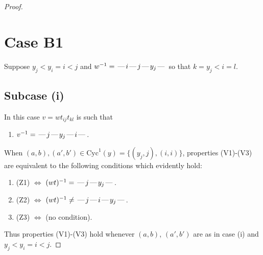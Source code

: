 \documentclass[10pt]{article}
\theoremstyle{definition}
\theoremstyle{definition}
\def\dash{\text{\hspace{0.5mm}---\hspace{0.5mm}}}
\def\Cyc{\mathrm{Cyc}}
\begin{document}
\begin{proof}
\section{Case B1}
Suppose $y_j < y_i = i < j$ and $w^{-1} = \dash i\dash j\dash y_j\dash $ so that $k=y_j < i=l$.
\subsection{Subcase (i)}
In this case $v = wt_{ij}t_{kl}$ is such that
\begin{enumerate}\item[]$v^{-1} = \dash j\dash y_j\dash i\dash $.\end{enumerate}
When $(a,b),(a',b')\in\Cyc^1(y)= \{(y_j,j),(i,i)\}$,
properties (V1)-(V3) are equivalent to the following conditions which evidently hold:
\begin{enumerate}
\item[](Z1) $\Leftrightarrow$ $(wt)^{-1} = \dash j \dash y_j \dash$.
\item[](Z2) $\Leftrightarrow$ $(wt)^{-1} \neq \dash j \dash i \dash y_j \dash$.
\item[](Z3) $\Leftrightarrow$ (no condition).
\end{enumerate}
Thus properties (V1)-(V3) hold whenever
$(a,b)$, $(a',b')$ are as in case (i) and $y_j < y_i = i < j$.

\end{proof}
\end{document}
